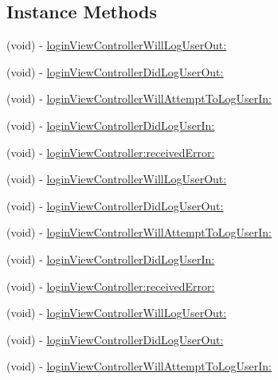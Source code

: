 \subsection*{Instance Methods}
\begin{DoxyCompactItemize}
\item 
(void) -\/ \hyperlink{protocolFBUserSettingsDelegate_01-p_a194e956d188265f18ec887255d90b7c8}{login\+View\+Controller\+Will\+Log\+User\+Out\+:}
\item 
(void) -\/ \hyperlink{protocolFBUserSettingsDelegate_01-p_a6e8b97e1802353fbbc0c5058189a3f79}{login\+View\+Controller\+Did\+Log\+User\+Out\+:}
\item 
(void) -\/ \hyperlink{protocolFBUserSettingsDelegate_01-p_a29fe822340933959a1b01785c50b7c4b}{login\+View\+Controller\+Will\+Attempt\+To\+Log\+User\+In\+:}
\item 
(void) -\/ \hyperlink{protocolFBUserSettingsDelegate_01-p_a66711ccf72e173107d8be71887034d05}{login\+View\+Controller\+Did\+Log\+User\+In\+:}
\item 
(void) -\/ \hyperlink{protocolFBUserSettingsDelegate_01-p_aa7340081c0402e123cdde904f5cf2c91}{login\+View\+Controller\+:received\+Error\+:}
\item 
(void) -\/ \hyperlink{protocolFBUserSettingsDelegate_01-p_a194e956d188265f18ec887255d90b7c8}{login\+View\+Controller\+Will\+Log\+User\+Out\+:}
\item 
(void) -\/ \hyperlink{protocolFBUserSettingsDelegate_01-p_a6e8b97e1802353fbbc0c5058189a3f79}{login\+View\+Controller\+Did\+Log\+User\+Out\+:}
\item 
(void) -\/ \hyperlink{protocolFBUserSettingsDelegate_01-p_a29fe822340933959a1b01785c50b7c4b}{login\+View\+Controller\+Will\+Attempt\+To\+Log\+User\+In\+:}
\item 
(void) -\/ \hyperlink{protocolFBUserSettingsDelegate_01-p_a66711ccf72e173107d8be71887034d05}{login\+View\+Controller\+Did\+Log\+User\+In\+:}
\item 
(void) -\/ \hyperlink{protocolFBUserSettingsDelegate_01-p_aa7340081c0402e123cdde904f5cf2c91}{login\+View\+Controller\+:received\+Error\+:}
\item 
(void) -\/ \hyperlink{protocolFBUserSettingsDelegate_01-p_a194e956d188265f18ec887255d90b7c8}{login\+View\+Controller\+Will\+Log\+User\+Out\+:}
\item 
(void) -\/ \hyperlink{protocolFBUserSettingsDelegate_01-p_a6e8b97e1802353fbbc0c5058189a3f79}{login\+View\+Controller\+Did\+Log\+User\+Out\+:}
\item 
(void) -\/ \hyperlink{protocolFBUserSettingsDelegate_01-p_a29fe822340933959a1b01785c50b7c4b}{login\+View\+Controller\+Will\+Attempt\+To\+Log\+User\+In\+:}

\end{DoxyCompactItemize}
